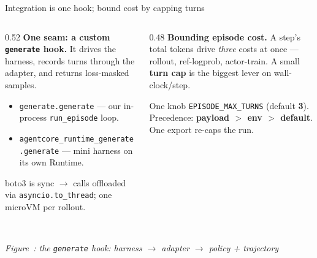 \documentclass[aspectratio=169]{beamer}
\newcounter{deckfig}
\newcommand{\figtag}[1]{\refstepcounter{deckfig}%
  {\scriptsize\itshape Figure~\thedeckfig: #1}}
\begin{document}
\begin{frame}{Integration is one hook; bound cost by capping turns}
  \begin{columns}[T]
    \begin{column}{0.52\textwidth}
      \footnotesize\textbf{One seam: a custom \texttt{generate} hook.} It drives the harness,
      records turns through the adapter, and returns loss-masked samples.
      \begin{itemize}\setlength\itemsep{0.15em}
        \item \texttt{generate.generate} --- our in-process \texttt{run\_episode} loop.
        \item \texttt{agentcore\_runtime\_generate.generate} --- mini harness on its own Runtime.
      \end{itemize}
      \footnotesize boto3 is sync $\to$ calls offloaded via \texttt{asyncio.to\_thread}; one microVM per rollout.
    \end{column}
    \begin{column}{0.48\textwidth}
      \footnotesize\textbf{Bounding episode cost.} A step's total tokens drive \emph{three} costs
      at once --- rollout, ref-logprob, actor-train. A small \textbf{turn cap} is the biggest
      lever on wall-clock/step.
      \begin{block}{One knob}
        \scriptsize \texttt{EPISODE\_MAX\_TURNS} (default \textbf{3}). Precedence:
        \textbf{payload $>$ env $>$ default}. One export re-caps the run.
      \end{block}
    \end{column}
  \end{columns}
  \begin{center}
  \\[0em]\figtag{the \texttt{generate} hook: harness $\to$ adapter $\to$ policy + trajectory}
  \end{center}
\end{frame}
\end{document}
